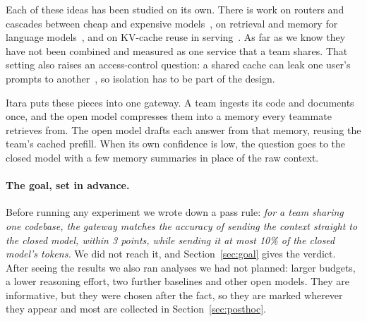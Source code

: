 \documentclass[10pt,twocolumn]{article}
\begin{document}
Each of these ideas has been studied on its own. There is work on routers and cascades between cheap and expensive models~\citep{chen2023frugalgpt,ding2024hybrid,ong2025routellm,gupta2024cascades}, on retrieval and memory for language models~\citep{lewis2020rag,packer2023memgpt}, and on KV-cache reuse in serving~\citep{kwon2023vllm,yao2025cacheblend}. As far as we know they have not been combined and measured as one service that a team shares. That setting also raises an access-control question: a shared cache can leak one user's prompts to another~\citep{song2024earlybird,gu2025auditing}, so isolation has to be part of the design.

Itara puts these pieces into one gateway. A team ingests its code and documents once, and the open model compresses them into a memory every teammate retrieves from. The open model drafts each answer from that memory, reusing the team's cached prefill. When its own confidence is low, the question goes to the closed model with a few memory summaries in place of the raw context.

\paragraph{The goal, set in advance.} Before running any experiment we wrote down a pass rule: \emph{for a team sharing one codebase, the gateway matches the accuracy of sending the context straight to the closed model, within 3 points, while sending it at most 10\% of the closed model's tokens.} We did not reach it, and Section~\ref{sec:goal} gives the verdict. After seeing the results we also ran analyses we had not planned: larger budgets, a lower reasoning effort, two further baselines and other open models. They are informative, but they were chosen after the fact, so they are marked wherever they appear and most are collected in Section~\ref{sec:posthoc}.
\end{document}
